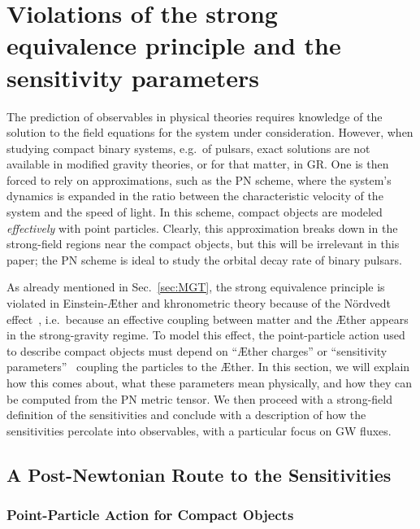 \documentclass[prd,aps,twocolumn,nofootinbib,showpacs,superscriptaddress]{revtex4-1}
\begin{document}
\section{Violations of the strong equivalence principle and the sensitivity parameters}
\label{sec:violations-SEP}

The prediction of observables in physical theories requires knowledge of the solution to the field equations for the system under consideration. 
However, when studying compact binary systems, e.g.~of  pulsars, exact solutions are not available in modified gravity theories, or for that matter, in GR. One is then forced to rely on approximations, such as the PN scheme, where the system's dynamics is expanded 
in the ratio between the characteristic velocity of the system
and the speed of light. In this scheme, compact objects are modeled \textit{effectively} with point particles.
Clearly, this approximation breaks down in the strong-field regions near the compact objects, but this will be
irrelevant in this paper; the PN scheme is ideal to study the orbital decay rate of binary pulsars.

As already mentioned in Sec.~\ref{sec:MGT}, the strong equivalence principle is violated in Einstein-\AE ther and khronometric theory
because of the N\"ordvedt
effect~\cite{nordvedt,nordvedt_dickes_interpretation}, i.e.~because an effective coupling between matter and the \AE ther appears in the strong-gravity regime.
To model this effect, the point-particle action used to describe compact objects must depend
on ``\AE ther charges'' or ``sensitivity parameters''~\cite{eardley,damour_esposito_farese} coupling the particles to the \AE ther.
In this section, we will explain how this comes about, what these parameters mean physically, and how they can be computed from the PN metric tensor. We then proceed with a strong-field definition of the sensitivities and conclude with a description of how the sensitivities percolate into observables, with a particular focus
on GW fluxes.

\subsection{A Post-Newtonian Route to the Sensitivities} 
\label{sec:PN-sensitivities}

\subsubsection{Point-Particle Action for Compact Objects}
\label{subsec:EOMs}
\end{document}
